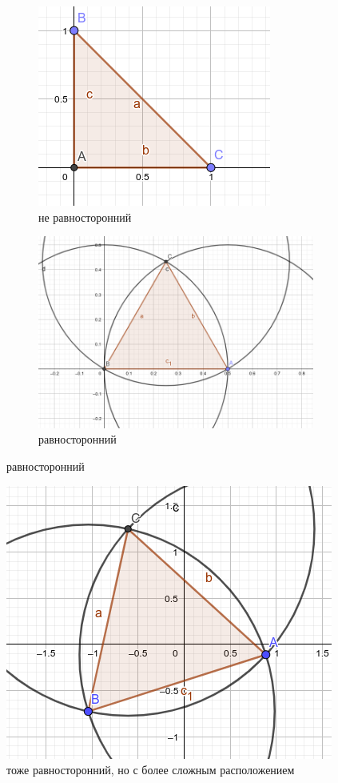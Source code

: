 \documentclass[12pt]{article}
\begin{document}
\begin{figure}[h!]
  \begin{subfigure}{.49\textwidth}
    \centering
    \includegraphics[width=.8\linewidth]{not-equal.png}
    \caption{не равносторонний}
  \end{subfigure}
  \begin{subfigure}{.49\textwidth}
    \centering
    \includegraphics[width=.8\linewidth]{equal.png}
    \caption{равносторонний}
  \end{subfigure}
\end{figure}
\begin{figure}[h!]
  \centering
  \includegraphics[width=.6\linewidth]{hard.png}
  \caption{тоже равносторонний, но с более сложным расположением}
\end{figure}
\end{document}
